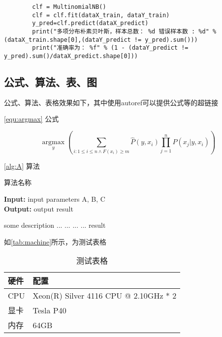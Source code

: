 \documentclass[UTF8,9pt]{ctexart}  %
\begin{document}
	
	\begin{verbatim}
		clf = MultinomialNB()
		clf = clf.fit(dataX_train, dataY_train)
		y_pred=clf.predict(dataX_predict)
		print("多项分布朴素贝叶斯，样本总数： %d 错误样本数 : %d" % (dataX_train.shape[0],(dataY_predict != y_pred).sum()))
		print("准确率为： %f" % (1 - (dataY_predict != y_pred).sum()/dataX_predict.shape[0]))
	\end{verbatim}



		\subsection{公式、算法、表、图}
		公式、算法、表格效果如下，其中使用autoref可以提供公式等的超链接
		
		\autoref{equ:argmax} 公式
		
		\begin{equation}
		\label{equ:argmax}
		\underset{y}{\operatorname{argmax}}\left(\sum_{i: 1 \leq i \leq n \wedge F\left(x_{i}\right) \geq m} \hat{P}\left(y, x_{i}\right) \prod_{j=1}^{n} \hat{P}\left(x_{j} | y, x_{i}\right)\right)
		\end{equation}
		
		\autoref{alg:A} 算法
		
		\begin{algorithm}[htb]
			\caption{算法名称} %
			\label{alg:A}
			\hspace*{0.02in} {\bf Input:} %
			input parameters A, B, C\\
			\hspace*{0.02in} {\bf Output:} %
			output result
			\begin{algorithmic}[1]
				\State some description %
				\State ...
				\State ...
				\Else
				\State ...
				\EndIf
				\EndFor
				\State ...
				\EndWhile
				\State \Return result
			\end{algorithmic}
		\end{algorithm}
	

		
		如\autoref{tab:machine}所示，为测试表格
		
		\begin{table}[htb]
			\centering
			\label{tab:machine}
			\caption{测试表格}
			\begin{tabular}{l l}
				\hline
				硬件 & 配置 \\ \hline
				CPU & Xeon(R) Silver 4116 CPU @ 2.10GHz * 2 \\ 
				显卡 & Tesla P40 \\ 
				内存 & 64GB \\ \hline
			\end{tabular}
		\end{table}
		
\end{document}
